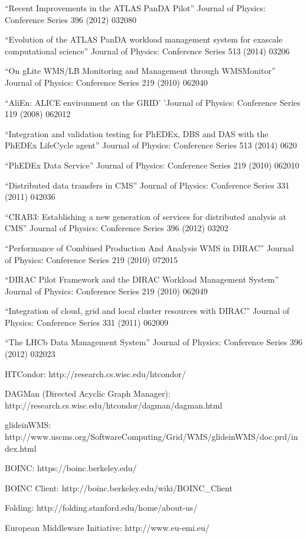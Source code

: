 \begin{thebibliography}{99}
 ``Recent Improvements in the ATLAS PanDA Pilot'' Journal of Physics: Conference Series 396 (2012) 032080

 ``Evolution of the ATLAS PanDA workload management system for exascale computational science'' Journal of Physics: Conference Series 513 (2014) 03206

 ``On gLite WMS/LB Monitoring and Management through WMSMonitor'' Journal of Physics: Conference Series 219 (2010) 062040

 ``AliEn: ALICE environment on the GRID' 'Journal of Physics: Conference Series 119 (2008) 062012

 ``Integration and validation testing for PhEDEx, DBS and DAS with the PhEDEx LifeCycle agent'' Journal of Physics: Conference Series 513 (2014) 0620

 ``PhEDEx Data Service'' Journal of Physics: Conference Series 219 (2010) 062010

 ``Distributed data transfers in CMS'' Journal of Physics: Conference Series 331 (2011) 042036

 ``CRAB3: Establishing a new generation of services for distributed analysis at CMS'' Journal of Physics: Conference Series 396 (2012) 03202

 ``Performance of Combined Production And Analysis WMS in DIRAC'' Journal of Physics: Conference Series 219 (2010) 072015

 ``DIRAC Pilot Framework and the DIRAC Workload Management System'' Journal of Physics: Conference Series 219 (2010) 062049

 ``Integration of cloud, grid and local cluster resources with DIRAC'' Journal of Physics: Conference Series 331 (2011) 062009

 ``The LHCb Data Management System'' Journal of Physics: Conference Series 396 (2012) 032023

 HTCondor: http://research.cs.wisc.edu/htcondor/

 DAGMan (Directed Acyclic Graph Manager): http://research.cs.wisc.edu/htcondor/dagman/dagman.html

 glideinWMS: http://www.uscms.org/SoftwareComputing/Grid/WMS/glideinWMS/doc.prd/index.html

 BOINC: https://boinc.berkeley.edu/

 BOINC Client: http://boinc.berkeley.edu/wiki/BOINC\_Client

 Folding: http://folding.stanford.edu/home/about-us/

 European Middleware Initiative: http://www.eu-emi.eu/
\end{thebibliography}
